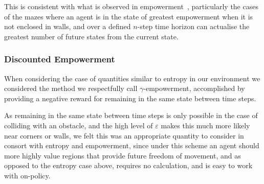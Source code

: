 \documentclass{article}
\begin{document}
This is consistent with what is observed in empowerment~\citep{klyubin2005empowerment}, particularly the cases of the mazes where an agent is in the state of greatest empowerment when it is not enclosed in walls, and over a defined $n$-step time horizon can actualise the greatest number of future states from the current state.

\subsubsection{Discounted Empowerment\label{gammares_exp}}
When considering the case of quantities similar to entropy in our environment we considered the method we respectfully call $\gamma$-empowerment, accomplished by providing a negative reward for remaining in the same state between time steps.

As remaining in the same state between time steps is only possible in the case of colliding with an obstacle, and the high level of $\varepsilon$ makes this much more likely near corners or walls, we felt this was an appropriate quantity to consider in consort with entropy and empowerment, since under this scheme an agent should more highly value regions that provide future freedom of movement, and as opposed to the entropy case above, requires no calculation, and is easy to work with on-policy.

%

\end{document}
